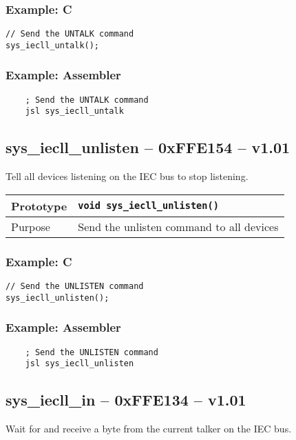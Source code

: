 \subsubsection*{Example: C}
\begin{lstlisting}
// Send the UNTALK command
sys_iecll_untalk();
\end{lstlisting}

\subsubsection*{Example: Assembler}
\begin{verbatim}
    ; Send the UNTALK command
    jsl sys_iecll_untalk
\end{verbatim}


\subsection*{sys\_iecll\_unlisten -- 0xFFE154 -- v1.01}
Tell all devices listening on the IEC bus to stop listening.

\bigskip

\begin{table}[!h]\begin{tabular}{|l||l|} \hline
Prototype & \lstinline!void sys_iecll_unlisten()! \\ \hline
Purpose & Send the {\sc unlisten} command to all devices \\ \hline
\end{tabular}\end{table}

\subsubsection*{Example: C}
\begin{lstlisting}
// Send the UNLISTEN command
sys_iecll_unlisten();
\end{lstlisting}

\subsubsection*{Example: Assembler}
\begin{verbatim}
    ; Send the UNLISTEN command
    jsl sys_iecll_unlisten
\end{verbatim}

\subsection*{sys\_iecll\_in -- 0xFFE134 -- v1.01}
Wait for and receive a byte from the current talker on the IEC bus.

